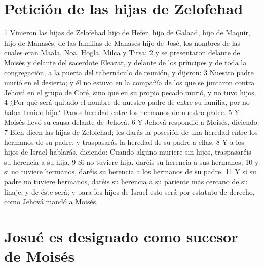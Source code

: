 \section*{Petición de las hijas de Zelofehad}


1 Vinieron las hijas de Zelofehad hijo de Hefer, hijo de Galaad, hijo de Maquir, hijo de Manasés, de las familias de Manasés hijo de José, los nombres de las cuales eran Maala, Noa, Hogla, Milca y Tirsa;
2 y se presentaron delante de Moisés y delante del sacerdote Eleazar, y delante de los príncipes y de toda la congregación, a la puerta del tabernáculo de reunión, y dijeron:
3 Nuestro padre murió en el desierto; y él no estuvo en la compañía de los que se juntaron contra Jehová en el grupo de Coré, sino que en su propio pecado murió, y no tuvo hijos.
4 ¿Por qué será quitado el nombre de nuestro padre de entre su familia, por no haber tenido hijo? Danos heredad entre los hermanos de nuestro padre.
5 Y Moisés llevó su causa delante de Jehová.
6 Y Jehová respondió a Moisés, diciendo:
7 Bien dicen las hijas de Zelofehad; les darás la posesión de una heredad entre los hermanos de su padre, y traspasarás la heredad de su padre a ellas.
8 Y a los hijos de Israel hablarás, diciendo: Cuando alguno muriere sin hijos, traspasaréis su herencia a su hija.
9 Si no tuviere hija, daréis su herencia a sus hermanos;
10 y si no tuviere hermanos, daréis su herencia a los hermanos de su padre.
11 Y si su padre no tuviere hermanos, daréis su herencia a su pariente más cercano de su linaje, y de éste será; y para los hijos de Israel esto será por estatuto de derecho, como Jehová mandó a Moisés.
\section*{Josué es designado como sucesor de Moisés}

